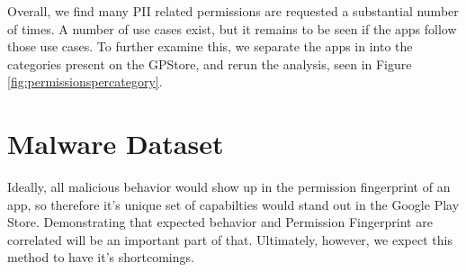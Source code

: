 Overall, we find many PII related permissions are requested a substantial number of times. A number of use cases exist, but it remains to be seen if the apps follow those use cases. To further examine this, we separate the apps in  into the categories present on the GPStore, and rerun the analysis, seen in Figure \ref{fig:permissionspercategory}.








\section{Malware Dataset}





Ideally, all malicious behavior would show up in the permission fingerprint of an app, so therefore it's unique set of capabilties would stand out in the Google Play Store. Demonstrating that expected behavior and Permission Fingerprint are correlated will be an important part of that. Ultimately, however, we expect this method to have it's shortcomings.
